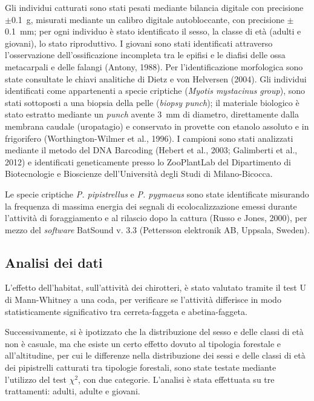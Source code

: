 \begin{multicols}{2}
Gli individui catturati sono stati pesati mediante bilancia digitale con precisione $\pm$0.1~g, misurati mediante un calibro digitale autobloccante, con precisione $\pm$0.1~mm; per ogni individuo è stato  identificato il sesso, la classe di età (adulti e giovani), lo stato riproduttivo. I giovani sono stati identificati attraverso l’osservazione dell’ossificazione incompleta tra le epifisi e le diafisi delle ossa metacarpali e delle falangi (Antony, 1988). Per l’identificazione morfologica sono state consultate le chiavi analitiche di Dietz e von Helversen (2004). Gli individui identificati come appartenenti a specie criptiche (\emph{Myotis mystacinus} \textit{group}), sono stati sottoposti a una biopsia della pelle (\textit{biopsy punch}); il materiale biologico è stato estratto mediante un \textit{punch} avente 3~mm di diametro, direttamente dalla membrana caudale (uropatagio) e conservato in provette con etanolo assoluto e in frigorifero (Worthington-Wilmer et al., 1996). I campioni sono stati analizzati mediante il metodo del DNA Barcoding (Hebert et al., 2003; Galimberti et al., 2012) e identificati geneticamente presso lo ZooPlantLab del Dipartimento di Biotecnologie e Bioscienze dell’Università degli Studi di Milano-Bicocca.

Le specie criptiche \emph{P. pipistrellus} e \emph{P. pygmaeus} sono state identificate misurando la frequenza di massima energia dei segnali di ecolocalizzazione emessi durante l’attività di foraggiamento e al rilascio dopo la cattura (Russo e Jones, 2000), per mezzo del \textit{software} BatSound v. 3.3 (Pettersson elektronik AB, Uppsala, Sweden).

\subsection*{Analisi dei dati}
L’effetto dell’habitat, sull’attività dei chirotteri, è stato valutato tramite il test U di Mann-Whitney a una coda, per verificare se l’attività differisce in modo statisticamente significativo tra cerreta-faggeta e abetina-faggeta. 

Successivamente, si è ipotizzato che la distribuzione del sesso e delle classi di età non è casuale, ma che esiste un certo effetto dovuto al tipologia forestale e all’altitudine, per cui le differenze nella distribuzione dei sessi e delle classi di età dei pipistrelli catturati tra tipologie forestali, sono state testate mediante l’utilizzo del test $\chi^2$, con due categorie. L’analisi è stata effettuata su tre trattamenti: \Male{} adulti, \Female{} adulte e giovani. 


\end{multicols}
